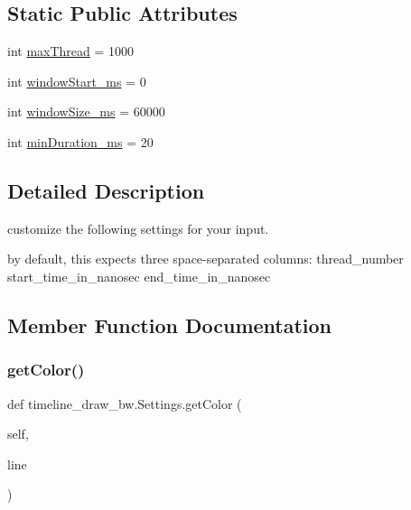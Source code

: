 \subsection*{Static Public Attributes}
\begin{DoxyCompactItemize}
\item 
int \hyperlink{classtimeline__draw__bw_1_1Settings_a941a3030f430ef7defb2cfde3045c504}{max\+Thread} = 1000
\item 
int \hyperlink{classtimeline__draw__bw_1_1Settings_a06f2f1a8d2657cd2cf303759a105a900}{window\+Start\+\_\+ms} = 0
\item 
int \hyperlink{classtimeline__draw__bw_1_1Settings_a0a6c1531e4af92cbc594e461180f5675}{window\+Size\+\_\+ms} = 60000
\item 
int \hyperlink{classtimeline__draw__bw_1_1Settings_a5ee81de952a739f08c3d5fa516f09471}{min\+Duration\+\_\+ms} = 20
\end{DoxyCompactItemize}


\subsection{Detailed Description}
customize the following settings for your input. 

by default, this expects three space-\/separated columns\+: thread\+\_\+number start\+\_\+time\+\_\+in\+\_\+nanosec end\+\_\+time\+\_\+in\+\_\+nanosec 

\subsection{Member Function Documentation}
\mbox{\label{classtimeline__draw__bw_1_1Settings_a173c1a3bf8d4ac4f607aff243ba06116}} 
\subsubsection{\texorpdfstring{get\+Color()}{getColor()}}
{\footnotesize\ttfamily def timeline\+\_\+draw\+\_\+bw.\+Settings.\+get\+Color (\begin{DoxyParamCaption}\item[{}]{self,  }\item[{}]{line }\end{DoxyParamCaption})}



